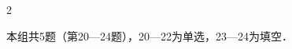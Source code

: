 \documentclass[fontset=none]{ctexart}
\begin{document}
\begin{multicols}{2}
\begin{ketang}{本组共5题（第20—24题），20—22为单选，23—24为填空．}
\end{ketang}

\par{} %
\tailfill

\end{multicols}
\end{document}
